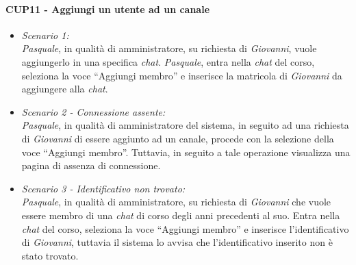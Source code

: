 \paragraph{CUP11 - Aggiungi un utente ad un canale\\}
\begin{itemize}
	\item \textit{Scenario 1:\\}
	\textit{Pasquale}, in qualità di amministratore, su richiesta di \textit{Giovanni}, vuole aggiungerlo in una specifica \textit{chat}. \textit{Pasquale}, entra nella \textit{chat} del corso, seleziona la voce “Aggiungi membro” e inserisce la matricola di \textit{Giovanni} da aggiungere alla \textit{chat}.\\
	
	\item \textit{Scenario 2 - Connessione assente:\\}
	\textit{Pasquale}, in qualità di amministratore del sistema, in seguito ad una richiesta di \textit{Giovanni} di essere aggiunto ad un canale, procede con la selezione della voce “Aggiungi membro”. Tuttavia, in seguito a tale operazione visualizza una pagina di assenza di connessione.\\
	
	\item \textit{Scenario 3 - Identificativo non trovato:\\}
	\textit{Pasquale}, in qualità di amministratore, su richiesta di \textit{Giovanni} che vuole essere membro di una \textit{chat} di corso degli anni precedenti al suo. Entra nella \textit{chat} del corso, seleziona la voce “Aggiungi membro” e inserisce l’identificativo di \textit{Giovanni}, tuttavia il sistema lo avvisa che l’identificativo inserito non è stato trovato.\\
\end{itemize}

